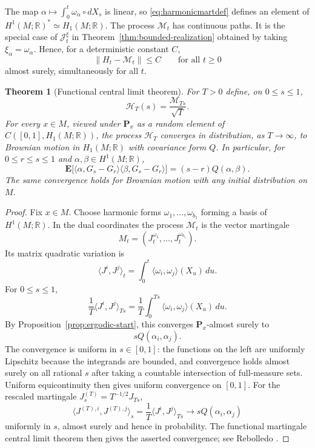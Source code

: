 \documentclass[a4paper,reqno]{amsart}
\newcommand{\R}{\mathbb R}
\newcommand{\Hcal}{\mathcal H}
\newcommand{\Pp}{\mathbf P}
\newcommand{\Ee}{\mathbf E}
\newtheorem{theorem}{Theorem}[section]
\theoremstyle{definition}
\begin{document}
The map $\alpha\mapsto\int_0^t\omega_\alpha\circ dX_s$ is linear, so
\eqref{eq:harmonicmartdef} defines an element of
$H^1(M;\R)^*\simeq H_1(M;\R)$.  The process $\mathcal M_t$ has continuous
paths.  It is the special case of $\mathcal J_t^\xi$ in
Theorem~\ref{thm:bounded-realization} obtained by taking
$\xi_\alpha=\omega_\alpha$.  Hence, for a deterministic constant $C$,
\begin{equation}\label{eq:norm-bounded-distance}
   \|H_t-\mathcal M_t\|\le C
   \qquad\text{for all }t\ge0
\end{equation}
almost surely, simultaneously for all $t$.

\begin{theorem}[Functional central limit theorem]\label{thm:functional}
For $T>0$ define, on $0\le s\le1$,
\[
   \Hcal_T(s)=\frac{\mathcal M_{Ts}}{\sqrt T}.
\]
For every $x\in M$, viewed under $\Pp_x$ as a random element of $C([0,1],H_1(M;\R))$, the process $\Hcal_T$ converges in distribution, as $T\to\infty$, to Brownian motion in $H_1(M;\R)$ with covariance form $Q$.  In particular, for $0\le r\le s\le1$ and $\alpha,\beta\in H^1(M;\R)$,
\[
   \Ee\bigl[
   \langle\alpha,G_s-G_r\rangle
   \langle\beta,G_s-G_r\rangle
   \bigr]
   =(s-r)Q(\alpha,\beta).
\]
The same convergence holds for Brownian motion with any initial distribution on $M$.
\end{theorem}

\begin{proof}
Fix $x\in M$.  Choose harmonic forms $\omega_1,\ldots,\omega_{b_1}$ forming a basis of $H^1(M;\R)$.  In the dual coordinates the process $\mathcal M_t$ is the vector martingale
\[
   M_t=(J_t^{\omega_1},\ldots,J_t^{\omega_{b_1}}).
\]
Its matrix quadratic variation is
\[
   \langle J^i,J^j\rangle_t
   =\int_0^t
   \langle\omega_i,\omega_j\rangle(X_u)\,du.
\]
For $0\le s\le1$,
\[
  \frac1T\langle J^i,J^j\rangle_{Ts}
  =\frac1T\int_0^{Ts}
  \langle\omega_i,\omega_j\rangle(X_u)\,du.
\]
By Proposition~\ref{prop:ergodic-start}, this converges $\Pp_x$-almost surely to
\[
   sQ(\alpha_i,\alpha_j).
\]
The convergence is uniform in $s\in[0,1]$: the functions on the left are uniformly Lipschitz because the integrands are bounded, and convergence holds almost surely on all rational $s$ after taking a countable intersection of full-measure sets.  Uniform equicontinuity then gives uniform convergence on $[0,1]$.  For the rescaled martingale $J_s^{(T)}=T^{-1/2}J_{Ts}$,
\[
 \langle J^{(T),i},J^{(T),j}\rangle_s
 =\frac1T\langle J^i,J^j\rangle_{Ts}
 \longrightarrow sQ(\alpha_i,\alpha_j)
\]
uniformly in $s$, almost surely and hence in probability.  The functional martingale central limit theorem then gives the asserted convergence; see Rebolledo \cite{Rebolledo}.
\end{proof}
\end{document}
